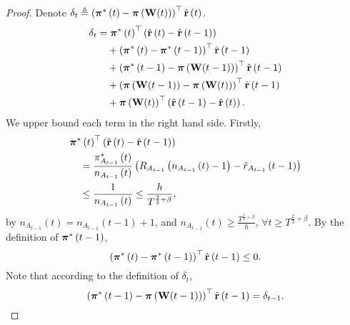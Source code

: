 \begin{proof}
    Denote $\delta_t \triangleq \left( {{\boldsymbol{\pi}}^*\left(t\right)} - {\boldsymbol{\pi}}\left( {\mathbf{W}}(t) \right) \right)^\top \hat{{\mathbf{r}}}\left(t\right)$.
\begin{equation}
\label{eq:dynamic_regret_decomposition}
\begin{split}
    \delta_t &= {{\boldsymbol{\pi}}^*\left(t\right)}^\top \left( \hat{{\mathbf{r}}}\left(t\right) - \hat{{\mathbf{r}}}\left(t-1\right)\right) \\
    &\quad + \left( {{\boldsymbol{\pi}}^*\left(t\right)} - {{\boldsymbol{\pi}}^*\left(t-1\right)} \right)^\top \hat{{\mathbf{r}}} \left(t-1\right) \\
    &\quad + \left( {{\boldsymbol{\pi}}^*\left(t-1\right)} - {\boldsymbol{\pi}}\left( {\mathbf{W}}(t-1) \right) \right)^\top \hat{{\mathbf{r}}}\left(t-1\right) \\
    &\quad + \left(  {\boldsymbol{\pi}}\left( {\mathbf{W}}(t-1) \right) - {\boldsymbol{\pi}}\left( {\mathbf{W}}(t) \right) 
    \right)^\top \hat{{\mathbf{r}}}\left(t-1\right) \\
    &\quad + {\boldsymbol{\pi}}\left( {\mathbf{W}}(t) \right)^\top \left( \hat{{\mathbf{r}}}\left(t-1\right) - \hat{{\mathbf{r}}}\left(t\right) \right).
\end{split}
\end{equation}
We upper bound each term in the right hand side. Firstly,
\begin{equation*}
\begin{split}
    &{{\boldsymbol{\pi}}^*\left(t\right)}^\top \left( \hat{{\mathbf{r}}}\left(t\right) - \hat{{\mathbf{r}}}\left(t-1\right)\right) \\
    &\quad = \frac{{\pi_{ A_{t-1}}^*\left(t\right)}}{n_{ A_{t-1}}\left(t\right)} \left( R_{ A_{t-1}}\left( n_{ A_{t-1}}\left(t\right) -1 \right) - \hat{r}_{ A_{t-1}}\left(t-1\right) \right) \\
    &\quad \le \frac{1}{n_{A_{t-1}}\left(t\right)} \le \frac{h}{T^{\frac{2}{3} + \beta}},
\end{split}
\end{equation*}
by $n_{A_{t-1}}\left(t\right) = n_{ A_{t-1}}\left(t-1\right) + 1$, and $n_{ A_{t-1}}\left(t\right) \ge \frac{T^{\frac{2}{3} + \beta}}{h}$, $\forall t \ge T^{\frac{2}{3} + \beta}$. By the definition of ${{\boldsymbol{\pi}}^*\left(t-1\right)}$,
\begin{equation*}
    \left( {{\boldsymbol{\pi}}^*\left(t\right)} - {{\boldsymbol{\pi}}^*\left(t-1\right)} \right)^\top \hat{{\mathbf{r}}}\left(t-1\right) \le 0.
\end{equation*}
Note that according to the definition of $\delta_t$,
\begin{equation*}
    \left( {\rvpi^*\left(t-1\right)} - \rvpi\left( \rmW(t-1) \right) \right)^\top \hat{\rvr}\left(t-1\right) = \delta_{t-1}.

\end{equation*}
\end{proof}
